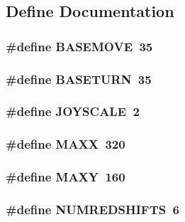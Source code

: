 \subsection{Define Documentation}
\hypertarget{WL__PLAY_8C_ac120c9862b4140e3f3b9bb6aaad6013d}{
\subsubsection[{BASEMOVE}]{\setlength{\rightskip}{0pt plus 5cm}\#define BASEMOVE~35}}
\label{WL__PLAY_8C_ac120c9862b4140e3f3b9bb6aaad6013d}
\hypertarget{WL__PLAY_8C_a3a2b917f95e7f8f9a5141fae0bb9b757}{
\subsubsection[{BASETURN}]{\setlength{\rightskip}{0pt plus 5cm}\#define BASETURN~35}}
\label{WL__PLAY_8C_a3a2b917f95e7f8f9a5141fae0bb9b757}
\hypertarget{WL__PLAY_8C_ae6dd494737de7bf6861cfefffb18288a}{
\subsubsection[{JOYSCALE}]{\setlength{\rightskip}{0pt plus 5cm}\#define JOYSCALE~2}}
\label{WL__PLAY_8C_ae6dd494737de7bf6861cfefffb18288a}
\hypertarget{WL__PLAY_8C_a7bb5845dcf8072f09f0a8d246b47e032}{
\subsubsection[{MAXX}]{\setlength{\rightskip}{0pt plus 5cm}\#define MAXX~320}}
\label{WL__PLAY_8C_a7bb5845dcf8072f09f0a8d246b47e032}
\hypertarget{WL__PLAY_8C_a25602e1c79852e5be195490eceff513f}{
\subsubsection[{MAXY}]{\setlength{\rightskip}{0pt plus 5cm}\#define MAXY~160}}
\label{WL__PLAY_8C_a25602e1c79852e5be195490eceff513f}
\hypertarget{WL__PLAY_8C_aa03e114d2c4f071feea44ba13072b4d3}{
\subsubsection[{NUMREDSHIFTS}]{\setlength{\rightskip}{0pt plus 5cm}\#define NUMREDSHIFTS~6}}
